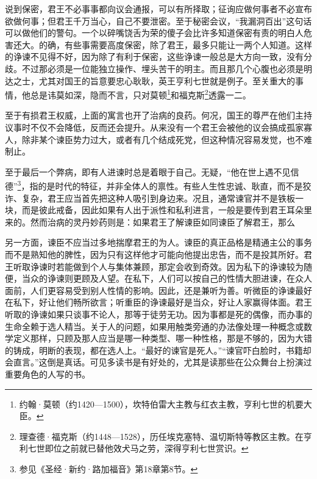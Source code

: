\par 说到保密，君王不必事事都向议会通报，可以有所择取；征询应做何事者不必宣布欲做何事；但君王千万当心，自己不要泄密。至于秘密会议，“我漏洞百出”这句话可以做他们的警句。一个以碎嘴饶舌为荣的傻子会比许多知道保密有责的明白人危害还大。的确，有些事需要高度保密，除了君王，最多只能让一两个人知道。这样的诤谏不见得不好，因为除了有利于保密，这些诤谏一般总是大方向一致，没有分歧。不过那必须是一位能独立操作、埋头苦干的明主。而且那几个心腹也必须是明达之士，尤其对国王的旨意要忠心耿耿，英王亨利七世就是例子。至关重大的事情，他总是讳莫如深，隐而不言，只对莫顿\footnote{约翰·莫顿（约1420—1500），坎特伯雷大主教与红衣主教，亨利七世的机要大臣。}和福克斯\footnote{理查德·福克斯（约1448—1528），历任埃克塞特、温切斯特等教区主教。在亨利七世即位之前就已替他效犬马之劳，深得亨利七世赏识。}透露一二。
\par 至于有损君王权威，上面的寓言也开了治病的良药。何况，国王的尊严在他们主持议事时不仅不会降低，反而还会提升。从来没有一个君王会被他的议会搞成孤家寡人，除非某个谏臣势力过大，或者有几个结成死党，但这种情况容易发觉，也不难制止。
\par 至于最后一个弊病，即有人进谏时总是着眼于自己。无疑，“他在世上遇不见信德”\footnote{参见《圣经·新约·路加福音》第18章第8节。}，指的是时代的特征，并非全体人的禀性。有些人生性忠诚、耿直，而不是狡诈、复杂，君王应当首先把这种人吸引到身边来。况且，通常谏官并不是铁板一块，而是彼此戒备，因此如果有人出于派性和私利进言，一般是要传到君王耳朵里来的。然而治病的灵丹妙药则是：如果君王了解谏臣如同谏臣了解君王，那么
\par 另一方面，谏臣不应当过多地揣摩君王的为人。谏臣的真正品格是精通主公的事务而不是熟知他的脾性，因为只有这样他才可能向他提出忠告，而不是投其所好。君王听取诤谏时若能做到个人与集体兼顾，那定会收到奇效。因为私下的诤谏较为随便，当众的诤谏则更顾及人望。在私下，人们可以按自己的性情大胆进谏，在众人面前，人们更容易受到别人性情的影响。因此，还是兼听为善。听微臣的诤谏最好在私下，好让他们畅所欲言；听重臣的诤谏最好是当众，好让人家赢得体面。君王听取的诤谏如果只谈事不论人，那等于徒劳无功。因为事都是死的偶像，而办事的生命全赖于选人精当。关于人的问题，如果用触类旁通的办法像处理一种概念或数学定义那样，只顾及那人应当是哪一种类型、哪一种性格，那是不够的，因为大错的铸成，明断的表现，都在选人上。“最好的谏官是死人。”“谏官吓白脸时，书籍却会直言。”这倒是真话。可见多读书是有好处的，尤其是读那些在公众舞台上扮演过重要角色的人写的书。
